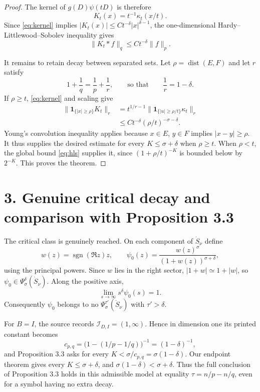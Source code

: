 \documentclass[11pt]{article}
\newcommand{\1}{\mathbf 1}
\newcommand{\dist}{\operatorname{dist}}
\newcommand{\sgn}{\operatorname{sgn}}
\newcommand{\Psiclass}[2]{\Psi_{#1}^{#2}}
\begin{document}
\begin{proof}
The kernel of $g(D)\psi(tD)$ is therefore
\[
 K_t(x)=t^{-1}\kappa_t(x/t).
\]
Since \eqref{eq:kernel} implies
$|K_t(x)|\le C t^{-\delta}|x|^{\delta-1}$, the one-dimensional
Hardy--Littlewood--Sobolev inequality gives
\begin{equation}\label{eq:hls}
 \|K_t*f\|_q\le C t^{-\delta}\|f\|_p.
\end{equation}

It remains to retain decay between separated sets.  Let
$\rho=\dist(E,F)$ and let $r$ satisfy
\[
 1+\frac1q=\frac1p+\frac1r,
 \qquad\text{so that}\qquad \frac1r=1-\delta.
\]
If $\rho\ge t$, \eqref{eq:kernel} and scaling give
\begin{align*}
 \|\1_{\{|x|\ge\rho\}}K_t\|_r
 &=t^{1/r-1}
   \|\1_{\{|u|\ge\rho/t\}}\kappa_t\|_r\\
 &\le C t^{-\delta}(\rho/t)^{-\sigma-\delta}.
\end{align*}
Young's convolution inequality applies because $x\in E$, $y\in F$ implies
$|x-y|\ge\rho$.  It thus supplies the desired estimate for every
$K\le\sigma+\delta$ when $\rho\ge t$.  When $\rho<t$, the global bound
\eqref{eq:hls} supplies it, since $(1+\rho/t)^{-K}$ is bounded below by
$2^{-K}$.  This proves the theorem.
\end{proof}

\section*{3. Genuine critical decay and comparison with Proposition 3.3}

The critical class is genuinely reached.  On each component of $\dot S_\nu$
define
\[
 w(z)=\sgn(\Re z)z,
 \qquad
 \psi_0(z)=\frac{w(z)^\sigma}{(1+w(z))^{\sigma+\delta}},
\]
using the principal powers.  Since $w$ lies in the right sector,
$|1+w|\simeq1+|w|$, so
$\psi_0\in\Psiclass{\sigma}{\delta}(\dot S_\nu)$.  Along the positive axis,
\[
 \lim_{s\to\infty}s^\delta\psi_0(s)=1.
\]
Consequently $\psi_0$ belongs to no
$\Psiclass{\sigma}{\tau'}(\dot S_\nu)$ with $\tau'>\delta$.

For $B=I$, the source records $\mathcal I_{D,I}=(1,\infty)$.  Hence in
dimension one its printed constant becomes
\[
 c_{p,q}=\bigl(1-(1/p-1/q)\bigr)^{-1}=(1-\delta)^{-1},
\]
and Proposition 3.3 asks for every
$K<\sigma/c_{p,q}=\sigma(1-\delta)$.  Our endpoint theorem gives every
$K\le\sigma+\delta$, and
$\sigma(1-\delta)<\sigma+\delta$.  Thus the full conclusion of Proposition
3.3 holds in this admissible model at equality
$\tau=n/p-n/q$, even for a symbol having no extra decay.
\end{document}
